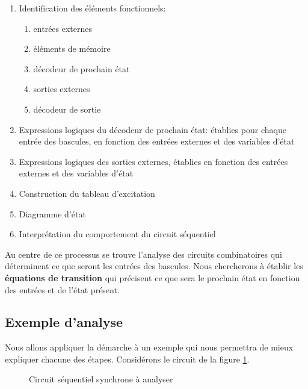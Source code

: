 \documentclass[11pt]{article}
\begin{document}
\begin{enumerate}
\item Identification des éléments fonctionnels:

\begin{enumerate}
\item entrées externes

\item éléments de mémoire

\item décodeur de prochain état

\item sorties externes

\item décodeur de sortie
\end{enumerate}
\item Expressions logiques du décodeur de prochain état: établies pour
chaque entrée des bascules, en fonction des entrées externes et des
variables d'état
\item Expressions logiques des sorties externes, établies en fonction des
entrées externes et des variables d'état
\item Construction du tableau d'excitation
\item Diagramme d'état
\item Interprétation du comportement du circuit séquentiel
\end{enumerate}

Au centre de ce processus se trouve l'analyse des circuits
combinatoires qui déterminent ce que seront les entrées des
bascules. Nous chercherons à établir les \textbf{équations de transition} qui
précisent ce que sera le prochain état en fonction des entrées et de
l'état présent.

\subsection{Exemple d'analyse}
\label{sec:orgcba9774}

Nous allons appliquer la démarche à un exemple qui nous permettra de
mieux expliquer chacune des étapes. Considérons le circuit de la
figure \ref{fig:org9e7779d}.

\begin{figure}[htbp]
\centering

\caption{\label{fig:org9e7779d}Circuit séquentiel synchrone à analyser}
\end{figure}
\end{document}
